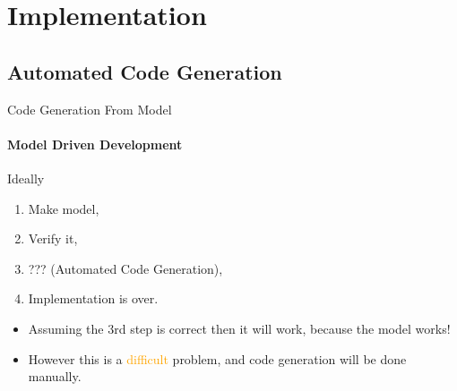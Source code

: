 \section{Implementation}
    \subsection{Automated Code Generation}
    \begin{frame}[t]{Code Generation From Model}\framesubtitle{Model Driven Development}
        Ideally
        \begin{enumerate}
            \item Make model,
            \item Verify it,
            \item ??? (Automated Code Generation),
            \item Implementation is over.
        \end{enumerate}
        \bigskip
        \begin{itemize}
            \item <2->Assuming the 3rd step is correct then it will work, because the model works!
            \item <3->However this is a \textcolor{orange}{difficult} problem, and code generation will be done manually. 
        \end{itemize}
    \end{frame}
